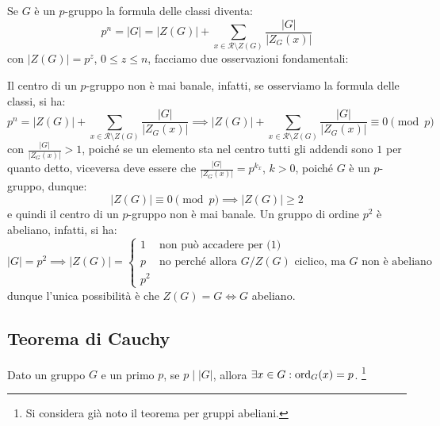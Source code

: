 \documentclass[11pt]{scrartcl}
\begin{document}
Se $G$ è un $p$-gruppo la formula delle classi diventa:
    \[ p^n = |G| = |Z(G)| + \sum_{x \in \mathcal{R}\setminus Z(G)} \frac{|G|}{|Z_G(x)|}
        \]
con $|Z(G)| = p^z$, $0 \leq z \leq n$, facciamo due osservazioni fondamentali:
    \begin{enumerate}[(1)]
        \ii Il centro di un $p$-gruppo non è mai banale, infatti, se osserviamo la formula delle classi, si ha:
            \[ p^n = |Z(G)| +  \sum_{x \in \mathcal{R}\setminus Z(G)} \frac{|G|}{|Z_G(x)|} \implies
             |Z(G)| +  \sum_{x \in \mathcal{R}\setminus Z(G)}\frac{|G|}{|Z_G(x)|} \equiv 0 \pmod p
                \]
            con $\displaystyle \frac{|G|}{|Z_G(x)|} > 1$, poiché se un elemento sta nel centro tutti gli addendi sono $1$ per quanto detto,
            viceversa deve essere che $\displaystyle \frac{|G|}{|Z_G(x)|} = p^{k_x}$, $k>0$, poiché $G$ è un $p$-gruppo, dunque:
                \[ |Z(G)| \equiv 0 \pmod p \implies |Z(G)| \geq 2
                    \]
            e quindi il centro di un $p$-gruppo non è mai banale.
        \ii Un gruppo di ordine $p^2$ è abeliano, infatti, si ha:
            \[ |G| = p^2 \implies |Z(G)| = \begin{cases}
                                                1 &\text{non può accadere per (1)} \\
                                                p &\text{no perché allora $G/Z(G)$ ciclico, ma $G$ non è abeliano}\\
                                                p^2
                                            \end{cases}
                \]
            dunque l'unica possibilità è che $Z(G) = G \iff G$ abeliano.
    \end{enumerate}

\newpage
\subsection{Teorema di Cauchy}

\begin{theorem}
    \label{p:Cauchy}
    Dato un gruppo $G$ e un primo $p$, se $p \mid |G|$, allora $\exists x \in G : \operatorname{ord}_G(x) = p$. \footnote{Si considera già noto il teorema per gruppi abeliani.}
\end{theorem}
\end{document}
